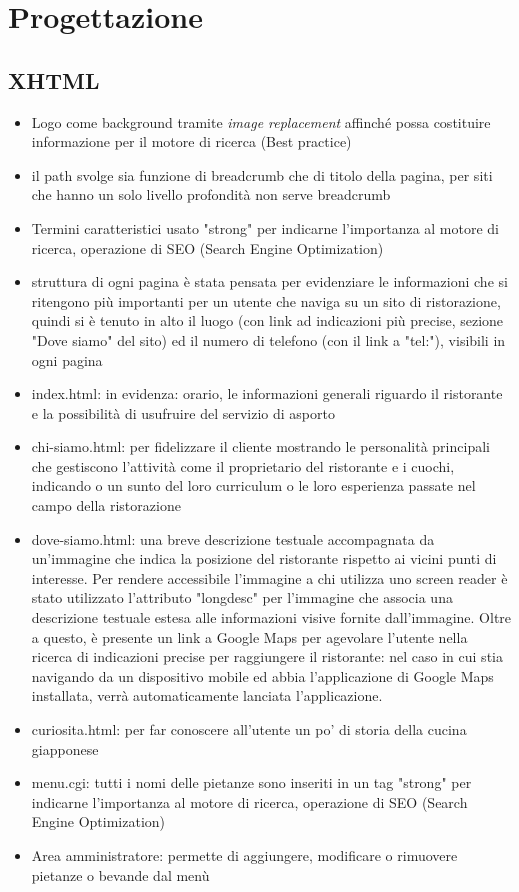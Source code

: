 \documentclass[../relazione.tex]{subfiles}
\begin{document}
\section{Progettazione}
	\subsection{XHTML}
	\begin{itemize}
		\item Logo come background tramite \textit{image replacement} affinché possa costituire informazione per il motore di ricerca (Best practice)
		\item il path svolge sia funzione di breadcrumb che di titolo della pagina, per siti che hanno un solo livello profondità non serve breadcrumb
		\item Termini caratteristici usato "strong" per indicarne l'importanza al motore di ricerca, operazione di SEO (Search Engine Optimization)
		\item struttura di ogni pagina è stata pensata per evidenziare le informazioni che si ritengono più importanti per un utente che naviga su un sito di ristorazione, quindi si è tenuto in alto il luogo (con link ad indicazioni più precise, sezione "Dove siamo" del sito) ed il numero di telefono (con il link a "tel:"), visibili in ogni pagina
		\item index.html: in evidenza: orario, le informazioni generali riguardo il ristorante e la possibilità di usufruire del servizio di asporto
		\item chi-siamo.html: per fidelizzare il cliente mostrando le personalità principali che gestiscono l'attività come il proprietario del ristorante e i cuochi, indicando o un sunto del loro curriculum o le loro esperienza passate nel campo della ristorazione
		\item dove-siamo.html: una breve descrizione testuale accompagnata da un'immagine che indica la posizione del ristorante rispetto ai vicini punti di interesse. Per rendere accessibile l'immagine a chi utilizza uno screen reader è stato utilizzato l'attributo "longdesc" per l'immagine che associa una descrizione testuale estesa alle informazioni visive fornite dall'immagine. Oltre a questo, è presente un link a Google Maps per agevolare l'utente nella ricerca di indicazioni precise per raggiungere il ristorante: nel caso in cui stia navigando da un dispositivo mobile ed abbia l'applicazione di Google Maps installata, verrà automaticamente lanciata l'applicazione.
		\item curiosita.html: per far conoscere all'utente un po' di storia della cucina giapponese
		\item menu.cgi: tutti i nomi delle pietanze sono inseriti in un tag "strong" per indicarne l'importanza al motore di ricerca, operazione di SEO (Search Engine Optimization)
		\item Area amministratore: permette di aggiungere, modificare o rimuovere pietanze o bevande dal menù
	\end{itemize}
\end{document}
